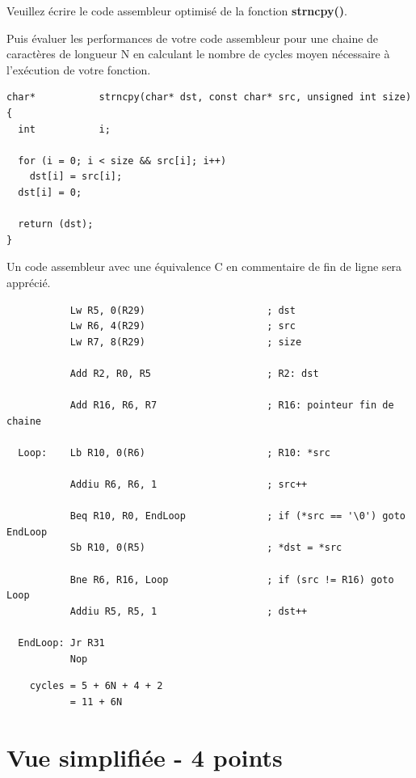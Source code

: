 {Veuillez \'ecrire le code assembleur optimis\'e de la fonction
\textbf{strncpy()}.

Puis \'evaluer les performances de votre code assembleur pour une chaine
de caract\`eres de longueur N en calculant le nombre de cycles moyen
n\'ecessaire \`a l'ex\'ecution de votre fonction.

\begin{verbatim}
char*           strncpy(char* dst, const char* src, unsigned int size)
{
  int           i;

  for (i = 0; i < size && src[i]; i++)
    dst[i] = src[i];
  dst[i] = 0;

  return (dst);
}
\end{verbatim}

Un code assembleur avec une \'equivalence C en commentaire de fin de ligne
sera appr\'eci\'e.

\begin{correction}

  \begin{verbatim}
           Lw R5, 0(R29)                     ; dst
           Lw R6, 4(R29)                     ; src
           Lw R7, 8(R29)                     ; size

           Add R2, R0, R5                    ; R2: dst

           Add R16, R6, R7                   ; R16: pointeur fin de chaine

  Loop:    Lb R10, 0(R6)                     ; R10: *src

           Addiu R6, R6, 1                   ; src++

           Beq R10, R0, EndLoop              ; if (*src == '\0') goto EndLoop
           Sb R10, 0(R5)                     ; *dst = *src

           Bne R6, R16, Loop                 ; if (src != R16) goto Loop
           Addiu R5, R5, 1                   ; dst++

  EndLoop: Jr R31
           Nop
  \end{verbatim}

  \begin{verbatim}
    cycles = 5 + 6N + 4 + 2
           = 11 + 6N
  \end{verbatim}
\end{correction}

%
%

\section{Vue simplifi\'ee - 4 points}

}
